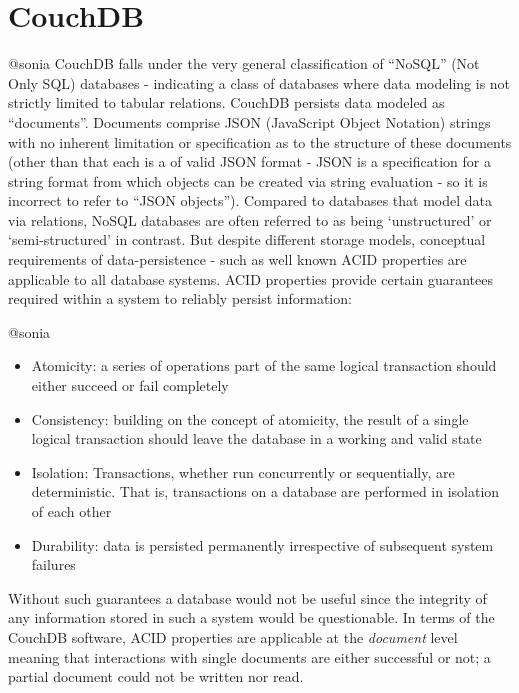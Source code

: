 \section{CouchDB}
@sonia
CouchDB falls under the very general classification of ``NoSQL'' (Not Only SQL) databases - indicating a class of databases where data modeling is not strictly limited to tabular relations. CouchDB persists data modeled as ``documents''. Documents comprise JSON (JavaScript Object Notation) strings with no inherent limitation or specification as to the structure of these documents (other than that each is a of valid JSON format - JSON is a specification for a string format from which objects can be created via string evaluation - so it is incorrect to refer to ``JSON objects''). Compared to databases that model data via relations, NoSQL databases are often referred to as being `unstructured' or `semi-structured' in contrast. But despite different storage models, conceptual requirements of data-persistence - such as well known ACID properties are applicable to all database systems. ACID properties provide certain guarantees required within a system to reliably persist information:

@sonia
\begin{itemize}
    \item Atomicity: a series of operations part of the same logical transaction should either succeed or fail completely
    \item Consistency: building on the concept of atomicity, the result of a single logical transaction should leave the database in a working and valid state
    \item Isolation: Transactions, whether run concurrently or sequentially, are deterministic. That is, transactions on a database are performed in isolation of each other
    \item Durability: data is persisted permanently irrespective of subsequent system failures
\end{itemize}

Without such guarantees a database would not be useful since the integrity of any information stored in such a system would be questionable. In terms of the CouchDB software, ACID properties are applicable at the \textit{document} level meaning that interactions with single documents are either successful or not; a partial document could not be written nor read.

